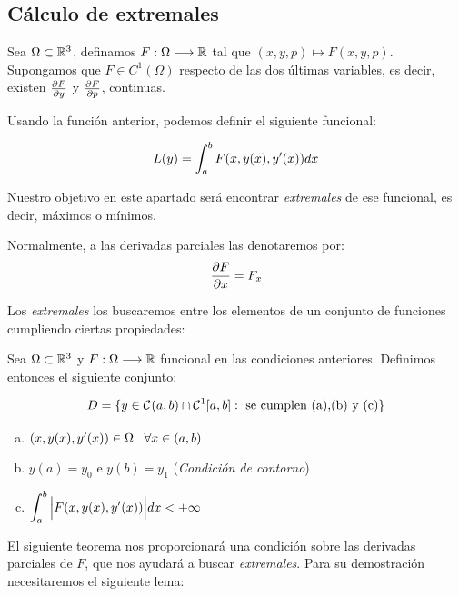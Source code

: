 \subsection{Cálculo de extremales}

Sea $\Omega\subset\R^3$, definamos $F:\Omega \longrightarrow \R$ tal que $(x,y,p)\longmapsto F(x,y,p)$. Supongamos que $F\in C^1(\Omega)$  respecto de las dos últimas variables, es decir, existen $\derivada{F}{y}$ y $\derivada{F}{p}$, continuas. 

Usando la función anterior, podemos definir el siguiente funcional:

\begin{equation}\label{funcional}
L(y) = \int_{a}^{b}\fvariaciones dx 
\end{equation}


Nuestro objetivo en este apartado será encontrar \textit{extremales} de ese funcional, es decir, máximos o mínimos.

\begin{notacion}
Normalmente, a las derivadas parciales las denotaremos por:
\[
\derivada{F}{x}=F_x
\]
\end{notacion}

Los \textit{extremales} los buscaremos entre los elementos de un conjunto de funciones cumpliendo ciertas propiedades:

\begin{definition}
\label{espaciofuncionesbuenas}

Sea $\Omega\subset\R^3$ y $F:\Omega\longrightarrow \R$ funcional en las condiciones anteriores. Definimos entonces el siguiente conjunto:

\begin{equation}\label{espaciofunciones}
D=\{y\in\continuasabierto\cap\continuas[1]: \text{ se cumplen (a),(b) y (c)}\}
\end{equation}

\begin{enumerate}[(a)]
\item $(x,y(x),y'(x))\in\Omega \espacio \forall x\in\xcero$
\item $y(a)=y_0$ e $y(b)=y_1$ (\textit{Condición de contorno})
\item $\displaystyle\int_{a}^b\Big|\fvariaciones\Big|dx<+\infty$ 
\end{enumerate}

\end{definition}

El siguiente teorema nos proporcionará una condición sobre las derivadas parciales de $F$, que nos ayudará a buscar \textit{extremales}. Para su demostración necesitaremos el siguiente lema:

